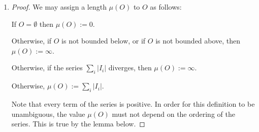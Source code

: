 \begin{enumerate}[label=(1.\arabic*)]
\begin{proof}
    Note that $I$ has at least two elements since $I$ is an equivalence class. It follows from transitivity of
    the equivalence relation that the elements of $\mc I$ are intervals.


    Finally we show that this is a countable union.

    Note that every rational number is in zero or one interval, but not more than one. Furthermore, every open
    interval contains at least one rational.

    Therefore there is a non-injective surjection from a subset of the rationals to the set of intervals.

    Therefore the cardinality of the set of intervals is not greater than the cardinality of the rationals.

    Therefore the set of intervals is countable.
  \end{proof}

\item
  \begin{proof}
    We may assign a length $\mu(O)$ to $O$ as follows:

    If $O = \emptyset$ then $\mu(O) := 0$.

    Otherwise, if $O$ is not bounded below, or if $O$ is not bounded above, then $\mu(O) := \infty$.

    Otherwise, if the series $\sum_i |I_i|$ diverges, then $\mu(O) := \infty$.

    Otherwise, $\mu(O) := \sum_i |I_i|$.

    Note that every term of the series is positive. In order for this definition to be unambiguous, the
    value $\mu(O)$ must not depend on the ordering of the series. This is true by the lemma below.
  \end{proof}


\end{enumerate}
